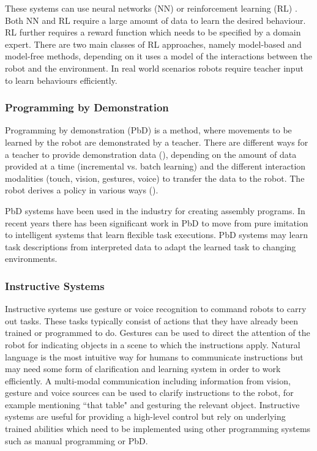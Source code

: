 These systems can use neural networks (NN) \cite{billard2001robust} or reinforcement learning (RL) \cite{smart2002effective}. Both NN and RL require a large amount of data to learn the desired behaviour. 
RL further requires a reward function which needs to be specified by a domain expert.
There are two main classes of RL approaches, namely model-based \cite{polypolydoros2017survey} and model-free \cite{kober2013reinforcement} methods, depending on it uses a model of the interactions between the robot and the environment.
In real world scenarios robots require teacher input to learn behaviours efficiently. 

\subsubsection{Programming by Demonstration}
Programming by demonstration (PbD) \cite{billard2008robot} is a method, where movements to be learned by the robot are demonstrated by a teacher. There are different ways for a teacher to provide demonstration data (), depending on the amount of data provided at a time (incremental vs. batch learning) and the different interaction modalities (touch, vision, gestures, voice) to transfer the data to the robot. The robot derives a policy in various ways (). 

PbD systems have been used in the industry for creating assembly programs. In recent years there has been significant work in PbD to move from pure imitation to intelligent systems that learn flexible task executions. PbD systems may learn task descriptions from interpreted data to adapt the learned task to changing environments.

\subsubsection{Instructive Systems}
Instructive systems use gesture or voice recognition to command robots to carry out tasks. These tasks typically consist of actions that they have already been trained or programmed to do. Gestures can be used to direct the attention of the robot for indicating objects in a scene to which the instructions apply. Natural language is the most intuitive way for humans to communicate instructions but may need some form of clarification and learning system in order to work efficiently. 
A multi-modal communication including information from vision, gesture and voice sources can be used to clarify instructions to the robot, for example mentioning ``that table" and gesturing the relevant object.
Instructive systems are useful for providing a high-level control but rely on underlying trained abilities which need to be implemented using other programming systems such as manual programming or PbD.

